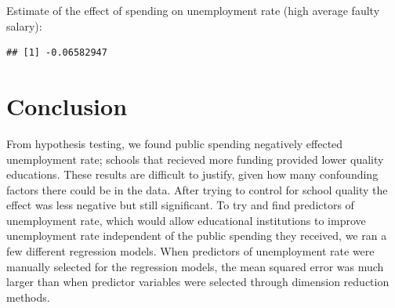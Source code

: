 \documentclass{article}\usepackage[]{graphicx}\usepackage[]{color}
\makeatletter
\newenvironment{kframe}{%
 \def\at@end@of@kframe{}%
 \ifinner\ifhmode%
  \def\at@end@of@kframe{\end{minipage}}%
  \begin{minipage}{\columnwidth}%
 \fi\fi%
 \def\FrameCommand##1{\hskip\@totalleftmargin \hskip-\fboxsep
 \colorbox{shadecolor}{##1}\hskip-\fboxsep
     \hskip-\linewidth \hskip-\@totalleftmargin \hskip\columnwidth}%
 \MakeFramed {\advance\hsize-\width
   \@totalleftmargin\z@ \linewidth\hsize
   \@setminipage}}%
 {\par\unskip\endMakeFramed%
 \at@end@of@kframe}
\newenvironment{knitrout}{}{} %
\makeatother
\begin{document}
Estimate of the effect of spending on unemployment rate (high average faulty salary):
\begin{knitrout}
\color{fgcolor}\begin{kframe}
\begin{verbatim}
## [1] -0.06582947
\end{verbatim}
\end{kframe}
\end{knitrout}
\maketitle
\section{Conclusion}
From hypothesis testing, we found public spending negatively effected unemployment rate; schools that recieved more funding provided lower quality educations. These results are difficult to justify, given how many confounding factors there could be in the data. After trying to control for school quality the effect was less negative but still significant. To try and find predictors of unemployment rate, which would allow educational institutions to improve unemployment rate independent of the public spending they received, we ran a few different regression models. When predictors of unemployment rate were manually selected for the regression models, the mean squared error was much larger than when predictor variables were selected through dimension reduction methods.
\end{document}
